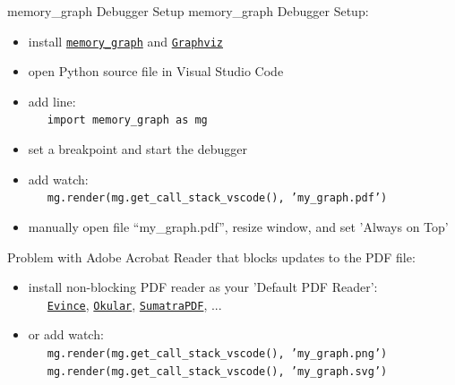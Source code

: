 \documentclass[10pt, colorlinks=true, urlcolor=blue]{beamer}
\begin{document}
\begin{frame}{memory\_graph Debugger Setup}
  \vspace{-1em}
  memory\_graph Debugger Setup:
  \begin{itemize}
  \item install \href{https://pypi.org/project/memory-graph/}{\texttt{memory\_graph}} and \href{https://graphviz.org/download/}{\texttt{Graphviz}}
  \item open Python source file in Visual Studio Code
  \item add line: \\ \ \ \ {\footnotesize \texttt{import memory_graph as mg}}
  \item set a breakpoint and start the debugger
  \item add watch: \\ \ \ \ {\footnotesize \texttt{mg.render(mg.get_call_stack_vscode(), 'my_graph.pdf')}}
  \item manually open file ``my\_graph.pdf'', resize window,  and set 'Always on Top'
  \end{itemize}
  
  \vspace{1.5em}
  
  Problem with Adobe Acrobat Reader that blocks updates to the PDF file:
  \begin{itemize}
  \item install non-blocking PDF reader as your 'Default PDF Reader': \\ \ \ \
    \href{https://www.fosshub.com/Evince.html}{\texttt{Evince}},
    \href{https://okular.kde.org/}{\texttt{Okular}},
    \href{https://www.sumatrapdfreader.org/}{\texttt{SumatraPDF}}, ...
  \item or add watch: \\
\ \ \ {\footnotesize \texttt{mg.render(mg.get_call_stack_vscode(), 'my_graph.png')}} \\
\ \ \ {\footnotesize \texttt{mg.render(mg.get_call_stack_vscode(), 'my_graph.svg')}}
  \end{itemize}
\end{frame}
\end{document}
